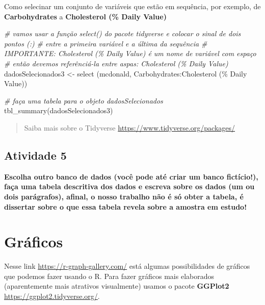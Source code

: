 \documentclass[
]{book}
\newenvironment{Shaded}{\begin{snugshade}}{\end{snugshade}}
\newcommand{\AttributeTok}[1]{\textcolor[rgb]{0.77,0.63,0.00}{#1}}
\newcommand{\CommentTok}[1]{\textcolor[rgb]{0.56,0.35,0.01}{\textit{#1}}}
\newcommand{\FunctionTok}[1]{\textcolor[rgb]{0.00,0.00,0.00}{#1}}
\newcommand{\NormalTok}[1]{#1}
\newcommand{\OtherTok}[1]{\textcolor[rgb]{0.56,0.35,0.01}{#1}}
\newcommand{\SpecialCharTok}[1]{\textcolor[rgb]{0.00,0.00,0.00}{#1}}
\newcommand{\StringTok}[1]{\textcolor[rgb]{0.31,0.60,0.02}{#1}}
\begin{document}
Como selecinar um conjunto de variáveis que estão em sequência, por exemplo, de \textbf{Carbohydrates} a \textbf{Cholesterol (\% Daily Value)}

\begin{Shaded}
\begin{Highlighting}[]
\CommentTok{\# vamos usar a função select() do pacote tidyverse e colocar o sinal de dois pontos (:)}
\CommentTok{\# entre a primeira variável e a última da sequência }
\CommentTok{\# IMPORTANTE: Cholesterol (\% Daily Value) é um nome de variável com espaço }
\CommentTok{\# então devemos referênciá{-}la entre aspas: \textasciigrave{}Cholesterol (\% Daily Value)\textasciigrave{}}
\NormalTok{dadosSelecionados3 }\OtherTok{\textless{}{-}} \FunctionTok{select}\NormalTok{ (mcdonald, Carbohydrates}\SpecialCharTok{:}\StringTok{\textasciigrave{}}\AttributeTok{Cholesterol (\% Daily Value)}\StringTok{\textasciigrave{}}\NormalTok{)}

\CommentTok{\# faça uma tabela para o objeto dadosSelecionados}
\FunctionTok{tbl\_summary}\NormalTok{(dadosSelecionados3)}
\end{Highlighting}
\end{Shaded}

\begin{quote}
Saiba mais sobre o Tidyverse \url{https://www.tidyverse.org/packages/}
\end{quote}

\hypertarget{atividade-5}{%
\section{Atividade 5}\label{atividade-5}}

\textbf{Escolha outro banco de dados (você pode até criar um banco fictício!), faça uma tabela descritiva dos dados e escreva sobre os dados (um ou dois parágrafos), afinal, o nosso trabalho não é só obter a tabela, é dissertar sobre o que essa tabela revela sobre a amostra em estudo!}

\hypertarget{gruxe1ficos}{%
\chapter{Gráficos}\label{gruxe1ficos}}

Nesse link \url{https://r-graph-gallery.com/} está algumas possibilidades de gráficos que podemos fazer usando o R. Para fazer gráficos mais elaborados (aparentemente mais atrativos visualmente) usamos o pacote \textbf{GGPlot2} \url{https://ggplot2.tidyverse.org/}.
\end{document}
